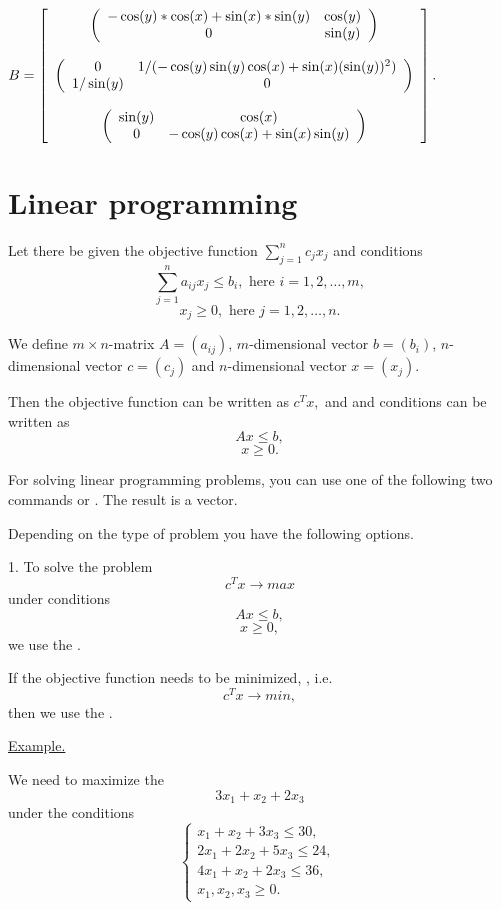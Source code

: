 {$B = \left[\begin{array}{c}
\mtr{-\cos(y)*\cos(x)+\sin(x)*\sin(y)}{\cos(y)}{0}{\sin(y)}\\
\null \\
\mtr{0}{1/(-\cos(y)\sin(y)\cos(x)+\sin(x)(\sin(y))^2)}{1/\sin(y)}{0}\\
\null \\
\mtr{\sin(y)}{\cos(x)}{0}{-\cos(y)\cos(x)+\sin(x)\sin(y)}\\
 \end{array}\right].$
} 
\section{Linear programming}
Let there be given the objective function $\sum_{j = 1}^n c_j x_j$
and conditions
$$\sum_{j = 1}^n a_{ij}x_j\leqslant b_i,\text{ here }i = 1,2,\ldots,m,$$
$$x_j\geqslant 0,\text{ here }j = 1,2,\ldots,n.$$

We define $m\times n$-matrix $A = (a_{ij})$,
$ m $-dimensional vector $b = (b_i)$, $n$-dimensional vector $c = (c_j)$ and 
$n$-dimensional vector $x = (x_j)$.

Then the objective function can be written as
$c^Tx,$ and and conditions can be written as 
$$Ax \leqslant b,$$
$$ x \geqslant 0.$$

For solving linear programming problems, you 
can use one of the following two commands
  or  . The result is a vector.

Depending on the type of problem you have the following options.

1. To solve the problem
$$c^Tx \rightarrow max$$
under conditions
$$Ax \leqslant b,$$
$$ x \geqslant 0,$$
we use the .

If the objective function needs to be minimized, , i.e. $$c^Tx \rightarrow min,$$ then we use the  .

\underline{%
Example.%
}

We need to maximize the $$3x_1 + x_2 + 2x_3$$
under the conditions
$$%
  \left\{
  \begin{array}{c}%
   x_1 +  x_2 + 3x_3 \leqslant 30,\ \\
  2x_1 + 2x_2 + 5x_3 \leqslant 24,\ \\
  4x_1 +  x_2 + 2x_3 \leqslant 36,\ \\
   x_1,   x_2,   x_3 \geqslant 0.%
  \end{array}
  \right.%
$$

